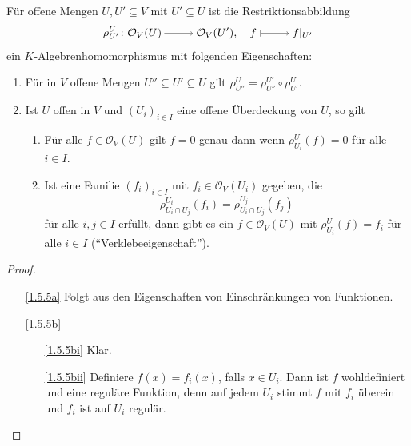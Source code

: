 \documentclass[a4paper,12pt,index=toc]{scrbook}
\theoremstyle{keinenummern} %
\def\O{\mathcal{O}}
\newcommand{\restrict}[1]{|_{#1}}
\begin{document}
\begin{bem}\label{1.5.5}
  Für offene Mengen $U,U'\subseteq V$ mit $U'\subseteq U$ ist die Restriktionsabbildung
  \begin{equation*} \rho^{U}_{U'}\colon \O_V(U)\ra\O_V(U'),\quad f\mapsto f\restrict{U'} \end{equation*}
  ein $K$-Algebrenhomomorphismus mit folgenden Eigenschaften:
  \begin{enumerate}
  \item{} Für in $V$ offene Mengen $U''\subseteq U'\subseteq U$ gilt $\rho^{U}_{U''}=\rho^{U'}_{U''}\circ\rho^{U}_{U'}$.
  \item{} Ist $U$ offen in $V$ und $(U_i)_{i\in I}$ eine offene Überdeckung von $U$, so gilt
    \begin{enumerate}
    \item{} Für alle $f\in\O_V(U)$ gilt $f=0$ genau dann wenn $\rho^{U}_{U_i}(f)=0$ für alle $i\in I$.
    \item{} Ist eine Familie $(f_i)_{i\in I}$ mit $f_i\in\O_V(U_i)$ gegeben, die 
    \begin{equation*}\rho^{U_i}_{U_i\cap U_j}(f_i)=\rho^{U_j}_{U_i\cap U_j}(f_j)\end{equation*}
      für alle $i,j\in I$ erfüllt, dann gibt es ein $f\in\O_V(U)$ mit
      $\rho^{U}_{U_i}(f)=f_i$ für alle $i\in I$
      (\enquote{Verklebeeigenschaft}).
    \end{enumerate}
  \end{enumerate}
\end{bem}
\begin{proof}
  \begin{enumerate}
  \item[\ref{1.5.5a}] Folgt aus den Eigenschaften von Einschränkungen von Funktionen.
  \item[\ref{1.5.5b}]
    \begin{enumerate}
    \item[\ref{1.5.5bi}] Klar.
    \item[\ref{1.5.5bii}] Definiere $f(x)=f_i(x)$, falls $x\in U_i$. Dann ist $f$ wohldefiniert und eine reguläre Funktion, denn
      auf jedem $U_i$  stimmt $f$ mit $f_i$ überein und $f_i$ ist auf $U_i$ regulär.
    \end{enumerate}
  \end{enumerate}
\end{proof}
\end{document}
